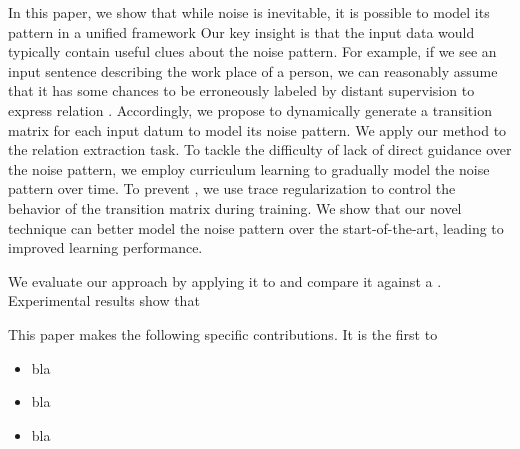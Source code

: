 In this paper, we show that while noise is inevitable, it is possible to model its pattern  in a unified framework Our key insight is that the input data would typically contain useful clues about the noise pattern. For example, if we see an input sentence describing the work place of a person, we can reasonably assume that it has some chances to be erroneously labeled by distant supervision to express relation  .
Accordingly, we propose to dynamically generate a transition matrix for each input datum to model its noise pattern. We apply our method to the relation extraction task. To tackle the difficulty of lack of direct guidance over the noise pattern, we employ curriculum learning to gradually model the noise pattern over time. To prevent , we use trace regularization to control the behavior of the transition matrix during training. 
We show that our novel technique can better model the noise pattern over the start-of-the-art, leading to improved learning performance. 

We evaluate our approach by applying it to  and compare it against a
. Experimental results show that 

This paper makes the following specific contributions. It is the first to
\begin{itemize}
\item bla
\item bla
\item bla
\end{itemize}

